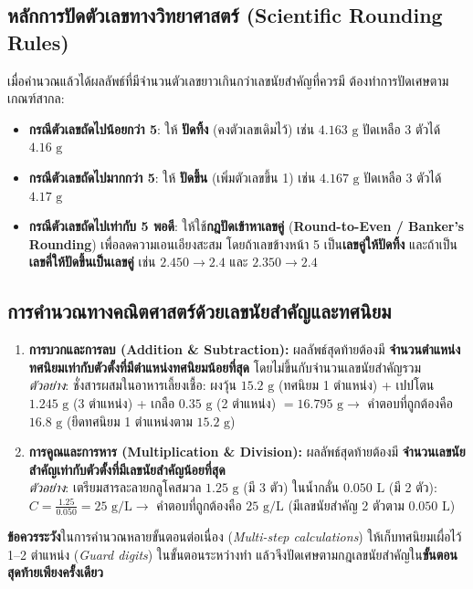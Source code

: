 \subsection{หลักการปัดตัวเลขทางวิทยาศาสตร์ (Scientific Rounding Rules)}

เมื่อคำนวณแล้วได้ผลลัพธ์ที่มีจำนวนตัวเลขยาวเกินกว่าเลขนัยสำคัญที่ควรมี ต้องทำการปัดเศษตามเกณฑ์สากล:
\begin{itemize}
    \item \textbf{กรณีตัวเลขถัดไปน้อยกว่า 5}: ให้ \textbf{ปัดทิ้ง} (คงตัวเลขเดิมไว้) เช่น $4.163\text{ g}$ ปัดเหลือ 3 ตัวได้ $4.16\text{ g}$
    \item \textbf{กรณีตัวเลขถัดไปมากกว่า 5}: ให้ \textbf{ปัดขึ้น} (เพิ่มตัวเลขขึ้น 1) เช่น $4.167\text{ g}$ ปัดเหลือ 3 ตัวได้ $4.17\text{ g}$
    \item \textbf{กรณีตัวเลขถัดไปเท่ากับ 5 พอดี}: ให้ใช้\textbf{กฎปัดเข้าหาเลขคู่} (\textbf{Round-to-Even / Banker's Rounding}) เพื่อลดความเอนเอียงสะสม โดยถ้าเลขข้างหน้า 5 เป็น\textbf{เลขคู่ให้ปัดทิ้ง} และถ้าเป็น\textbf{เลขคี่ให้ปัดขึ้นเป็นเลขคู่} เช่น $2.450 \rightarrow 2.4$ และ $2.350 \rightarrow 2.4$
\end{itemize}

\subsection{การคำนวณทางคณิตศาสตร์ด้วยเลขนัยสำคัญและทศนิยม}

\begin{bioappbox}
\begin{enumerate}
    \item \textbf{การบวกและการลบ (Addition \& Subtraction):} ผลลัพธ์สุดท้ายต้องมี \textbf{จำนวนตำแหน่งทศนิยมเท่ากับตัวตั้งที่มีตำแหน่งทศนิยมน้อยที่สุด} โดยไม่ขึ้นกับจำนวนเลขนัยสำคัญรวม\\
    \textit{ตัวอย่าง}: ชั่งสารผสมในอาหารเลี้ยงเชื้อ: ผงวุ้น $15.2\text{ g}$ (ทศนิยม 1 ตำแหน่ง) + เปปโตน $1.245\text{ g}$ (3 ตำแหน่ง) + เกลือ $0.35\text{ g}$ (2 ตำแหน่ง) $= 16.795\text{ g} \rightarrow$ คำตอบที่ถูกต้องคือ \textbf{$16.8\text{ g}$} (ยึดทศนิยม 1 ตำแหน่งตาม $15.2\text{ g}$)
    \item \textbf{การคูณและการหาร (Multiplication \& Division):} ผลลัพธ์สุดท้ายต้องมี \textbf{จำนวนเลขนัยสำคัญเท่ากับตัวตั้งที่มีเลขนัยสำคัญน้อยที่สุด}\\
    \textit{ตัวอย่าง}: เตรียมสารละลายกลูโคสมวล $1.25\text{ g}$ (มี 3 ตัว) ในน้ำกลั่น $0.050\text{ L}$ (มี 2 ตัว):\\
    $C = \frac{1.25}{0.050} = 25\text{ g/L} \rightarrow$ คำตอบที่ถูกต้องคือ \textbf{$25\text{ g/L}$} (มีเลขนัยสำคัญ 2 ตัวตาม $0.050\text{ L}$)
\end{enumerate}
\vspace{2pt}
\noindent\textbf{ข้อควรระวัง}\quad ในการคำนวณหลายขั้นตอนต่อเนื่อง (\textit{Multi-step calculations}) ให้เก็บทศนิยมเผื่อไว้ 1--2 ตำแหน่ง (\textit{Guard digits}) ในขั้นตอนระหว่างทำ แล้วจึงปัดเศษตามกฎเลขนัยสำคัญใน\textbf{ขั้นตอนสุดท้ายเพียงครั้งเดียว}
\end{bioappbox}

